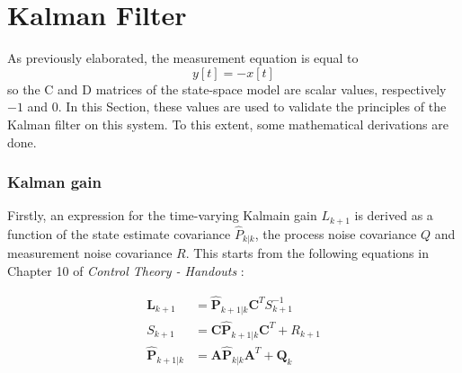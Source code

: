\documentclass[a4paper,kul]{kulakarticle} %
\begin{document}
\section{Kalman Filter}
As previously elaborated, the measurement equation is equal to 
\begin{equation}
	y[t] = -x[t]
	\label{eq:eq7}
\end{equation}
so the C and D matrices of the state-space model are scalar values, respectively $-1$ and $0$. In this Section, these values are used to validate the principles of the Kalman filter on this system. To this extent, some mathematical derivations are done. 

\subsubsection*{Kalman gain}

Firstly, an expression for the time-varying Kalmain gain $L_{k+1}$ is derived as a function of the state estimate covariance $\hat{P}_{k|k}$, the process noise covariance $Q$ and measurement noise covariance $R$. This starts from the following equations in Chapter 10 of \textit{Control Theory - Handouts} \cite{slidescontroltheory}:

\begin{align}
	\mathbf{L}_{k+1} &= \mathbf{\hat{P}}_{k+1|k} \mathbf{C}^T S_{k+1}^{-1} \label{eq:eq8}\\
	S_{k+1} &= \mathbf{C \hat{P}}_{k+1|k} \mathbf{C}^T + R_{k+1} \label{eq:eq9}\\
	\mathbf{\hat{P}}_{k+1|k} &= \mathbf{A} \mathbf{\hat{P}}_{k|k} \mathbf{A}^T + \mathbf{Q}_k \label{eq:eq10}
\end{align}
\end{document}
